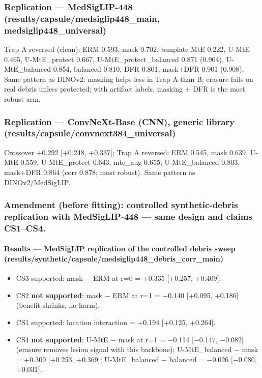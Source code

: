 {\subsubsection{Replication --- MedSigLIP-448 (results/capsule/medsiglip448\_main, medsiglip448\_universal)}\label{replication--medsiglip-448-resultscapsulemedsiglip448_main-medsiglip448_universal}

Trap A reversed (clean): ERM 0.593, mask 0.702, template MtE 0.222, U-MtE 0.465, U-MtE\_protect 0.667,
U-MtE\_protect\_balanced 0.871 (0.904), U-MtE\_balanced 0.854, balanced 0.810, DFR 0.801, mask+DFR 0.901 (0.908).
Same pattern as DINOv2: masking helps less in Trap A than B; erasure fails on real debris unless protected; with
artifact labels, masking + DFR is the most robust arm.

\subsubsection{Replication --- ConvNeXt-Base (CNN), generic library (results/capsule/convnext384\_universal)}\label{replication--convnext-base-cnn-generic-library-resultscapsuleconvnext384_universal}

Crossover +0.292 {[}+0.248, +0.337{]}; Trap A reversed: ERM 0.545, mask 0.639, U-MtE 0.559, U-MtE\_protect 0.643,
mte\_aug 0.655, U-MtE\_balanced 0.803, mask+DFR 0.864 (corr 0.878; most robust). Same pattern as DINOv2/MedSigLIP.

\subsubsection{Amendment (before fitting): controlled synthetic-debris replication with MedSigLIP-448 --- same design and claims CS1--CS4.}\label{amendment-before-fitting-controlled-synthetic-debris-replication-with-medsiglip-448--same-design-and-claims-cs1cs4}

\paragraph{Results --- MedSigLIP replication of the controlled debris sweep (results/synthetic/capsule/medsiglip448\_debris\_corr\_main)}\label{results--medsiglip-replication-of-the-controlled-debris-sweep-resultssyntheticcapsulemedsiglip448_debris_corr_main}

\begin{itemize}

\item
  CS3 supported: mask − ERM at r=0 = +0.335 {[}+0.257, +0.409{]}.
\item
  CS2 \textbf{not supported}: mask − ERM at r=1 = +0.140 {[}+0.095, +0.186{]} (benefit shrinks, no harm).
\item
  CS1 supported: location interaction = +0.194 {[}+0.125, +0.264{]}.
\item
  CS4 \textbf{not supported}: U-MtE − mask at r=1 = −0.114 {[}−0.147, −0.082{]} (erasure removes lesion signal with this
  backbone); U-MtE\_balanced − mask = +0.309 {[}+0.253, +0.369{]}; U-MtE\_balanced − balanced = −0.026 {[}−0.080, +0.031{]}.
\end{itemize}

}

